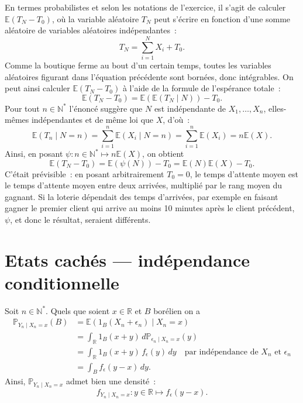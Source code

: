 En termes probabilistes et selon les notations de l'exercice, il s'agit
de calculer \(\mathbb{E}(T_N - T_0)\), où la variable aléatoire \(T_N\)
peut s'écrire en fonction d'une somme aléatoire de variables aléatoires
indépendantes~: \[T_N = \sum_{i = 1}^N X_i + T_0.\] Comme la boutique
ferme au bout d'un certain temps, toutes les variables aléatoires
figurant dans l'équation précédente sont bornées, donc intégrables. On
peut ainsi calculer \(\mathbb{E}(T_N-T_0)\) à l'aide de la formule de
l'espérance totale~:
\[\mathbb{E}\left(T_N - T_0\right) = \mathbb{E}\left(\mathbb{E}\left(T_N \mid N\right)\right) - T_0.\]
Pour tout \(n\in\mathbb{N}^\ast\) l'énoncé suggère que \(N\) est
indépendante de \(X_1,\dots,X_n\), elles-mêmes indépendantes et de même
loi que \(X\), d'où~:
\[\mathbb{E}\left(T_n \mid N = n\right) = \sum_{i = 1}^n \mathbb{E}(X_i\mid N = n) = \sum_{i = 1}^n \mathbb{E}(X_i) = n\mathbb{E}(X).\]
Ainsi, en posant
\(\psi : n \in\mathbb{N}^\ast \mapsto n \mathbb{E}(X)\), on obtient
\[\mathbb{E}\left(T_N - T_0\right) = \mathbb{E}\left(\psi(N)\right) - T_0 = \mathbb{E}(N)\mathbb{E}(X) - T_0.\]
C'était prévisible~: en posant arbitrairement \(T_0 = 0\), le temps
d'attente moyen est le temps d'attente moyen entre deux arrivées,
multiplié par le rang moyen du gagnant. Si la loterie dépendait des
temps d'arrivées, par exemple en faisant gagner le premier client qui
arrive au moins 10 minutes après le client précédent, \(\psi\), et donc
le résultat, seraient différents.

\section{Etats cachés --- indépendance
conditionnelle}\label{III-etats-cachuxe9s-induxe9pendance-conditionnelle-1}

\label{III-answer-ec1}
Soit \(n\in\mathbb{N}^\ast\). Quels que soient \(x\in\mathbb{R}\) et
\(B\) borélien on a \begin{align*}
\mathbb{P}_{Y_n \mid X_n = x}(B) &= \mathbb{E}\left(1_B(X_n+\epsilon_n) \mid X_n = x \right)\\
&= \int_\mathbb{R}1_B(x+y)\,d\mathbb{P}_{\epsilon_n\mid X_n = x}(y)\\
& = \int_\mathbb{R}1_B(x+y)\,f_\epsilon(y)\,dy \hspace{1em}\text{par indépendance de $X_n$ et $\epsilon_n$}\\
&= \int_B f_\epsilon(y-x)\,dy.
\end{align*} Ainsi, \(\mathbb{P}_{Y_n\mid X_n =x}\) admet bien une
densité~:
\[f_{Y_n\mid X_n=x} : y \in\mathbb{R}\mapsto f_\epsilon(y - x).\]

